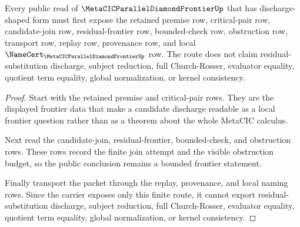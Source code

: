 \begin{theorem}
\label{thm:metacic-parallel-diamond-frontier-public-discharge-route}
Every public read of $\MetaCICParallelDiamondFrontierUp$ that has discharge-shaped form must first expose the retained premise row, critical-pair row, candidate-join row, residual-frontier row, bounded-check row, obstruction row, transport row, replay row, provenance row, and local $\NameCert_{\MetaCICParallelDiamondFrontierUp}$ row. The route does not claim residual-substitution discharge, subject reduction, full Church-Rosser, evaluator equality, quotient term equality, global normalization, or kernel consistency.
\end{theorem}
\begin{proof}
Start with the retained premise and critical-pair rows. They are the displayed frontier data that make a candidate discharge readable as a local frontier question rather than as a theorem about the whole MetaCIC calculus.

Next read the candidate-join, residual-frontier, bounded-check, and obstruction rows. These rows record the finite join attempt and the visible obstruction budget, so the public conclusion remains a bounded frontier statement.

Finally transport the packet through the replay, provenance, and local naming rows. Since the carrier exposes only this finite route, it cannot export residual-substitution discharge, subject reduction, full Church-Rosser, evaluator equality, quotient term equality, global normalization, or kernel consistency.
\end{proof}
